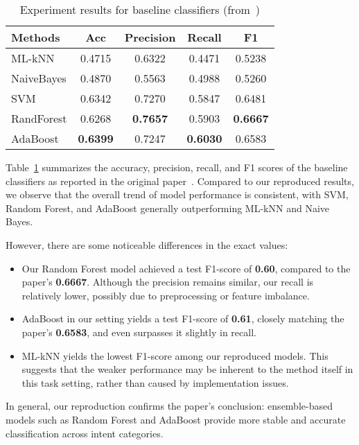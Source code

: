 \documentclass{article}
\begin{document}
\begin{table}[htbp]
\centering
\caption{Experiment results for baseline classifiers (from~\cite{qu2019user})}
\label{tab:baseline-results}
\begin{tabular}{lcccc}
\toprule
\textbf{Methods} & \textbf{Acc} & \textbf{Precision} & \textbf{Recall} & \textbf{F1} \\
\midrule
ML-kNN     & 0.4715 & 0.6322 & 0.4471 & 0.5238 \\
NaiveBayes & 0.4870 & 0.5563 & 0.4988 & 0.5260 \\
SVM        & 0.6342 & 0.7270 & 0.5847 & 0.6481 \\
RandForest & 0.6268 & \textbf{0.7657} & 0.5903 & \textbf{0.6667} \\
AdaBoost   & \textbf{0.6399} & 0.7247 & \textbf{0.6030} & 0.6583 \\
\bottomrule
\end{tabular}
\end{table}

Table~\ref{tab:baseline-results} summarizes the accuracy, precision, recall, and F1 scores of the baseline classifiers as reported in the original paper~\cite{qu2019user}. Compared to our reproduced results, we observe that the overall trend of model performance is consistent, with SVM, Random Forest, and AdaBoost generally outperforming ML-kNN and Naive Bayes.

However, there are some noticeable differences in the exact values:

\begin{itemize}
  \item Our Random Forest model achieved a test F1-score of \textbf{0.60}, compared to the paper’s \textbf{0.6667}. Although the precision remains similar, our recall is relatively lower, possibly due to preprocessing or feature imbalance.
  \item AdaBoost in our setting yields a test F1-score of \textbf{0.61}, closely matching the paper’s \textbf{0.6583}, and even surpasses it slightly in recall.
  \item ML-kNN yields the lowest F1-score among our reproduced models.
  This suggests that the weaker performance may be inherent to the method itself in this task setting, rather than caused by implementation issues.

\end{itemize}

In general, our reproduction confirms the paper’s conclusion: ensemble-based models such as Random Forest and AdaBoost provide more stable and accurate classification across intent categories.
\end{document}
